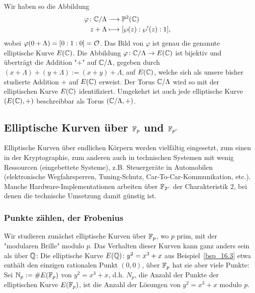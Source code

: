 Wir haben so die Abbildung
\begin{equation}
\begin{aligned}
	\varphi \colon \mathbb{C} / \Lambda &\longrightarrow \mathbb{P}^2(\mathbb{C}) \\
	z+\Lambda &\longmapsto [\wp(z) : \wp'(z) : 1],
\end{aligned}
\end{equation}
wobei $\varphi(0 + \Lambda) = [0:1:0] = \mathcal{O}$.
Das Bild von $\varphi$ ist genau die genannte elliptische Kurve $E(\mathbb{C})$.
Die Abbildung $\varphi \colon \mathbb{C}/\Lambda \rightarrow E(\mathbb{C})$ ist bijektiv und überträgt die Addition "$+$" auf $\mathbb{C}/\Lambda$, gegeben durch $(x+\Lambda) + (y+\Lambda) := (x+y) + \Lambda$, auf $E(\mathbb{C})$, welche sich als unsere bisher studierte Addition $+$ auf $E(\mathbb{C})$ erweist.
Der Torus $\mathbb{C}/\Lambda$ wird so mit der elliptischen Kurve $E(\mathbb{C})$ identifiziert.
Umgekehrt ist auch jede elliptische Kurve $(E(\mathbb{C}),+)$ beschreibbar als Torus $(\mathbb{C}/\Lambda,+)$.

\nextlecture
\newpage
\subsection{Elliptische Kurven über $\mathbb{F}_p$ und $\mathbb{F}_{p^r}$}
\label{sub:3.3}
\begin{bem}
	Elliptische Kurven über endlichen Körpern werden vielfältig eingesetzt, zum einen in der Kryptographie, zum anderen auch in technischen Systemen mit wenig Ressourcen (eingebettete Systeme), z.B. Steuergeräte in Automobilen (elektronische Wegfahrsperren, Tuning-Schutz, Car-To-Car-Kommunikation, etc.).
	Manche Hardware-Implementationen arbeiten über $\mathbb{F}_{2^r}$ der Charakteristik $2$, bei denen die technische Umsetzung damit günstig ist.
\end{bem}

\subsubsection{Punkte zählen, der Frobenius}
\label{subsub:3.3.1}
\begin{bem}
	Wir studieren zunächst elliptische Kurven über $\mathbb{F}_p$, wo $p$ prim, mit der "modularen Brille" modulo $p$.
	Das Verhalten dieser Kurven kann ganz anders sein als über $\mathbb{Q}$:
	Die elliptische Kurve $E(\mathbb{Q})\colon y^2 = x^3 + x$ aus Beispiel~\ref{bsp_16.3} etwa enthält den einzigen rationalen Punkt $(0,0)$, über $\mathbb{F}_p$ hat sie aber viele Punkte:
	Sei $\mathbb{N}_p := \#E(\mathbb{F}_p)$ von $y^2 = x^3 + x$, d.h. $N_p$, die Anzahl der Punkte der elliptischen Kurve $E(\mathbb{F}_p)$, ist die Anzahl der Lösungen von $y^2 = x^3 + x$ modulo $p$.
\end{bem}

